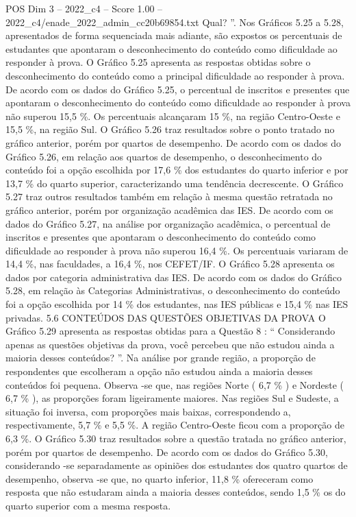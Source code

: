 \begin{textsample}{POS Dim 3 – 2022\_c4 – Score 1.00 – 2022\_c4/enade\_2022\_admin\_cc20b69854.txt}
Qual? ”.
Nos Gráficos 5.25 a 5.28, apresentados de forma sequenciada mais adiante, são expostos os percentuais de estudantes que apontaram o desconhecimento do conteúdo como dificuldade ao responder à prova.
O Gráfico 5.25 apresenta as respostas obtidas sobre o desconhecimento do conteúdo como a principal dificuldade ao responder à prova.
De acordo com os dados do Gráfico 5.25, o percentual de inscritos e presentes que apontaram o desconhecimento do conteúdo como dificuldade ao responder à prova não superou 15,5 \%.
Os percentuais alcançaram 15 \%, na região Centro-Oeste e 15,5 \%, na região Sul.
O Gráfico 5.26 traz resultados sobre o ponto tratado no gráfico anterior, porém por quartos de desempenho.
De acordo com os dados do Gráfico 5.26, em relação aos quartos de desempenho, o desconhecimento do conteúdo foi a opção escolhida por 17,6 \% dos estudantes do quarto inferior e por 13,7 \% do quarto superior, caracterizando uma tendência decrescente.
O Gráfico 5.27 traz outros resultados também em relação à mesma questão retratada no gráfico anterior, porém por organização acadêmica das IES.
De acordo com os dados do Gráfico 5.27, na análise por organização acadêmica, o percentual de inscritos e presentes que apontaram o desconhecimento do conteúdo como dificuldade ao responder à prova não superou 16,4 \%.
Os percentuais variaram de 14,4 \%, nas faculdades, a 16,4 \%, nos CEFET/IF.
O Gráfico 5.28 apresenta os dados por categoria administrativa das IES.
De acordo com os dados do Gráfico 5.28, em relação às Categorias Administrativas, o desconhecimento do conteúdo foi a opção escolhida por 14 \% dos estudantes, nas IES públicas e 15,4 \% nas IES privadas. 5.6 CONTEÚDOS DAS QUESTÕES OBJETIVAS DA PROVA O Gráfico 5.29 apresenta as respostas obtidas para a Questão 8 : “ Considerando apenas as questões objetivas da prova, você percebeu que não estudou ainda a maioria desses conteúdos? ”.
Na análise por grande região, a proporção de respondentes que escolheram a opção não estudou ainda a maioria desses conteúdos foi pequena.
Observa -se que, nas regiões Norte ( 6,7 \% ) e Nordeste ( 6,7 \% ), as proporções foram ligeiramente maiores.
Nas regiões Sul e Sudeste, a situação foi inversa, com proporções mais baixas, correspondendo a, respectivamente, 5,7 \% e 5,5 \%.
A região Centro-Oeste ficou com a proporção de 6,3 \%.
O Gráfico 5.30 traz resultados sobre a questão tratada no gráfico anterior, porém por quartos de desempenho.
De acordo com os dados do Gráfico 5.30, considerando -se separadamente as opiniões dos estudantes dos quatro quartos de desempenho, observa -se que, no quarto inferior, 11,8 \% ofereceram como resposta que não estudaram ainda a maioria desses conteúdos, sendo 1,5 \% os do quarto superior com a mesma resposta.

\end{textsample}
